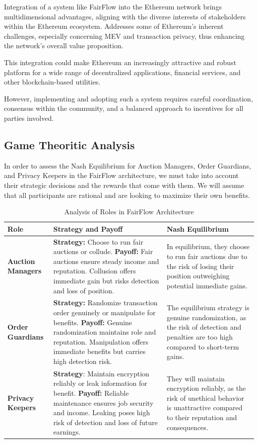 \documentclass{article}
\begin{document}
Integration of a system like FairFlow into the Ethereum network brings multidimensional advantages, aligning with the diverse interests of stakeholders within the Ethereum ecosystem. Addresses some of Ethereum's inherent challenges, especially concerning MEV and transaction privacy, thus enhancing the network's overall value proposition. 

This integration could make Ethereum an increasingly attractive and robust platform for a wide range of decentralized applications, financial services, and other blockchain-based utilities. 

However, implementing and adopting such a system requires careful coordination, consensus within the community, and a balanced approach to incentives for all parties involved.

\subsection{Game Theoritic Analysis}

In order to assess the Nash Equilibrium for Auction Managers, Order Guardians, and Privacy Keepers in the FairFlow architecture, we must take into account their strategic decisions and the rewards that come with them. We will assume that all participants are rational and are looking to maximize their own benefits.

\begin{table}[h]
\centering
\begin{tabular}{ | m{2cm} | m{6cm} | m{6cm} | }
\hline
\textbf{Role} & \textbf{Strategy and Payoff} & \textbf{Nash Equilibrium} \\
\hline

\textbf{Auction Managers} & 
\textbf{Strategy:} Choose to run fair auctions or collude. \textbf{Payoff:} Fair auctions ensure steady income and reputation. Collusion offers immediate gain but risks detection and loss of position. & 
In equilibrium, they choose to run fair auctions due to the risk of losing their position outweighing potential immediate gains. \\
\hline

\textbf{Order Guardians} & 
\textbf{Strategy:} Randomize transaction order genuinely or manipulate for benefits. \textbf{Payoff:} Genuine randomization maintains role and reputation. Manipulation offers immediate benefits but carries high detection risk. & 
The equilibrium strategy is genuine randomization, as the risk of detection and penalties are too high compared to short-term gains. \\
\hline

\textbf{Privacy Keepers} & 
\textbf{Strategy}: Maintain encryption reliably or leak information for benefit.\textbf{ Payoff:} Reliable maintenance ensures job security and income. Leaking poses high risk of detection and loss of future earnings. & 
They will maintain encryption reliably, as the risk of unethical behavior is unattractive compared to their reputation and consequences. \\
\hline
\end{tabular}
\caption{Analysis of Roles in FairFlow Architecture}
\label{table:fairflow-roles}
\end{table}
\end{document}
